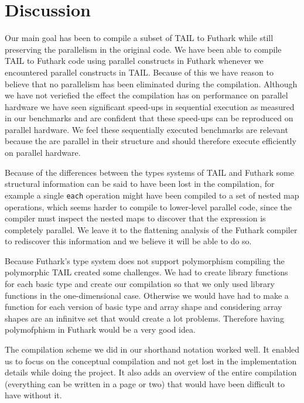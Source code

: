 \documentclass[11pt]{article}
\begin{document}
\section{Discussion}
\label{sec:discussion}
Our main goal has been to compile a subset of TAIL \cite{ElsmanDybdal:Array:2014} to Futhark while still preserving the parallelism in the original code. 
We have been able to compile TAIL to Futhark code using parallel constructs in Futhark whenever we encountered parallel constructs in TAIL.
Because of this we have reason to believe that no parallelism has been eliminated during the compilation.
Although we have not veriefied the effect the compilation has on performance on parallel hardware we have seen significant speed-ups
in sequential execution as measured in our benchmarks and are confident that these speed-ups can be reproduced on parallel hardware.
We feel these sequentially executed benchmarks are relevant because the are parallel in their structure and should therefore
execute efficiently on parallel hardware.

Because of the differences between the types systems of TAIL and Futhark some structural information can be said to have been lost
in the compilation, for example a single {\tt each} operation might have been compiled to a set of nested map operations,
which seems harder to compile to lower-level parallel code, since the compiler must inspect the nested maps to discover that
the expression is completely parallel. We leave it to the flattening analysis of the Futhark compiler to rediscover this
information and we believe it will be able to do so.

Because Futhark's type system does not support polymorphism compiling the polymorphic TAIL created some challenges.
We had to create library functions for each basic type and create our compilation so that we only used library functions in the one-dimensional case.
Otherwise we would have had to make a function for each version of basic type and array shape and considering array shapes are an infinitve set that would create a lot problems. Therefore having polymofphism in Futhark would be a very good idea.

The compilation scheme we did in our shorthand notation worked well.
It enabled us to focus on the conceptual compilation and not get lost in the implementation details while doing the project.
It also adds an overview of the entire compilation (everything can be written in a page or two) that would have been difficult to have without it.
\end{document}
